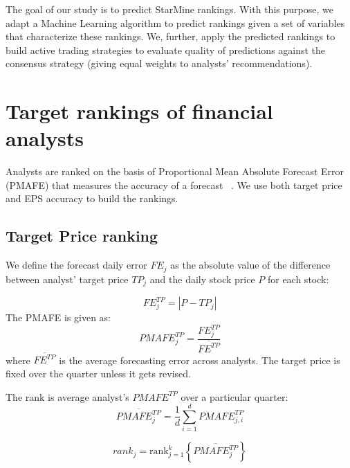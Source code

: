 \documentclass[a4paper,twoside,12pt,openright,notitlepage]{report}\usepackage[]{graphicx}\usepackage[]{color}
\begin{document}
The goal of our study is to predict  StarMine rankings. With this purpose, we adapt a Machine Learning  algorithm to predict rankings  given a set of variables that characterize these rankings. We, further, apply the predicted rankings  to build active trading strategies to evaluate quality of predictions against the consensus strategy (giving equal weights to analysts' recommendations).






\section{Target rankings of financial analysts}
\label{ch4:sec-tr}
 Analysts are ranked on the basis of Proportional Mean Absolute Forecast Error (PMAFE) that measures the accuracy of a forecast ~\citep{clement1999,brown2001,ertimur2007}. We use both target price and EPS accuracy to build the rankings.

\subsection{Target Price ranking}
\label{ch4:rank}
 We define the forecast daily error  $FE_{j}$ as the absolute value of the difference between analyst' target price $TP_{j}$ and the daily stock price $P$ for each stock:

\begin{equation}
	\label{ch4-dfe}
	FE_{j}^{TP}=|{P-TP_{j}}|
\end{equation}
The PMAFE is given as:
\begin{equation}
	\label{ch4-tp:pmafe}
	PMAFE_{j}^{TP}=\frac{FE_{j}^{TP}}{\overline{FE^{TP}}}
\end{equation}
where $\overline{{FE}^{TP}}$ is the average forecasting error across analysts. The target price is fixed over the quarter unless it gets revised.

The rank is average analyst's $PMAFE^{TP}$ over a particular quarter:
\begin{equation}
	\overline{PMAFE_{j}^{TP}}=\frac{1}{d} \sum_{i=1}^{d} PMAFE_{j,i}^{TP}
\end{equation}

\begin{equation}
	\label{ch4-tp:rank}
	rank_{j}=\mathrm{rank}_{j=1}^{k} \left\{ \overline{PMAFE_{j}^{TP}} \right\}
\end{equation}
\end{document}
